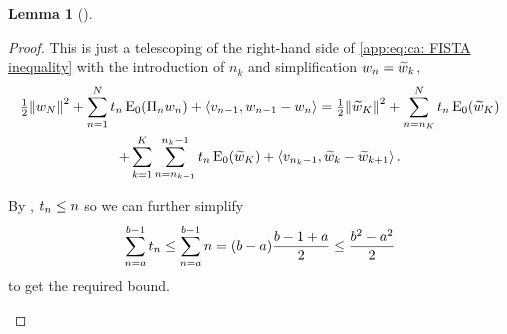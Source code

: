 \documentclass[10pt,a4paper,onecolumn]{article} \usepackage[latin1]{inputenc}
\numberwithin{equation}{section}
\newtheorem{lemma}{Lemma}[section]\newtheorem{example}{Example}[section]
\newcommand{\norm}[1]{{\left\lVert #1 \right\rVert}}
\newcommand{\IP}[2]{\left\langle #1,#2 \right\rangle}\newcommand{\ip}[2]{#1 \vcenter{\hbox{\resizebox{6pt}{!}{\ensuremath\cdot}}} #2}
\newcommand{\op}[1]{\operatorname{#1}}\newcommand{\overtext}[2]{\stackrel{\text{#1}}{#2}}
\newcommand*{\Func}[1]{%
	\IfEqCase{#1}{%
		{0}{\op{E}}%
		{1}{\op{F}}%
		{2}{\op{G}}%
		{3}{\op{H}}%
	}[\op{F}#1]%
}
\newcommand*{\varf}[1]{%
	\IfEqCase{#1}{%
		{0}{u}%
		{1}{v}%
		{2}{w}%
	}[u#1]%
}
\newcommand*{\vart}[1]{%
	\IfEqCase{#1}{%
		{0}{s}%
		{1}{t}%
	}[t#1]%
}
\newcommand*{\vars}[1]{%
	\IfEqCase{#1}{%
		{0}{\alpha}%
		{1}{\beta}%
		{2}{\gamma}%
		{3}{a}%
		{4}{b}%
		{5}{c}%
	}[k#1]%
}
\begin{document}
\begin{lemma}[]\label{app:thm:ca: mini exponential FISTA convergence}
\end{lemma}
\begin{proof}
	This is just a telescoping of the right-hand side of \eqref{app:eq:ca: FISTA inequality} with the introduction of $n_k$ and simplification $\varf2_n = \tilde{\varf2}_k$,
	\begin{multline*}
		\tfrac12\norm{\varf2_N}^2 + \sum^N_{n=1} \vart1_n\Func0_0(\Pi_n\varf2_n) + \IP{\varf1_{n-1}}{\varf2_{n-1}-\varf2_n} = \tfrac12\norm{\tilde{\varf2}_K}^2 + \sum_{n=n_K}^N\vart1_n\Func0_0(\tilde{\varf2}_K) 
		\\+ \sum_{k=1}^K\sum_{n=n_{k-1}}^{n_k-1}\vart1_n\Func0_0(\tilde{\varf2}_K) 
		+ \IP{\varf1_{n_k-1}}{\tilde{\varf2}_k-\tilde{\varf2}_{k+1}}.
	\end{multline*}
	\begin{samepage}
		By , $\vart1_n\leq n$ so we can further simplify
		$$\sum_{n=\vars3}^{\vars4-1}\vart1_n \leq \sum_{n=\vars3}^{\vars4-1}n = (\vars4-\vars3)\frac{\vars4-1+\vars3}{2} \leq \frac{\vars4^2-\vars3^2}{2}$$
		to get the required bound.
	\end{samepage}
\end{proof}
\end{document}
